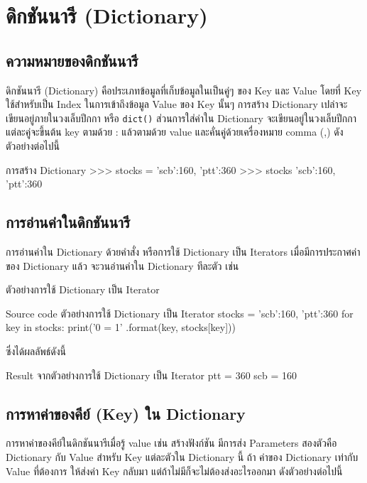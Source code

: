 \chapter{ดิกชันนารี (Dictionary)}
\section{ความหมายของดิกชันนารี}

ดิกชันนารี (Dictionary) คือประเภทข้อมูลที่เก็บข้อมูลในเป็นคู่ๆ ของ Key และ Value โดยที่ Key ใช้สำหรับเป็น Index ในการเข้าถึงข้อมูล Value ของ Key นั้นๆ การสร้าง Dictionary เปล่าจะเขียนอยู่ภายในวงเล็บปีกกา { } หรือ \texttt{dict()} ส่วนการใส่ค่าใน Dictionary จะเขียนอยู่ในวงเล็บปีกกา แต่ละคู่จะขึ้นต้น key ตามด้วย : แล้วตามด้วย value และคั่นคู่ด้วยเครื่องหมาย comma (,) ดังตัวอย่างต่อไปนี้

\begin{codelist}{การสร้าง Dictionary}{}
>>> stocks = {'scb':160, 'ptt':360}
>>> stocks
{'scb':160, 'ptt':360}
\end{codelist}


\section{การอ่านค่าในดิกชันนารี}

การอ่านค่าใน Dictionary ด้วยคำสั่ง  หรือการใช้ Dictionary เป็น Iterators เมื่อมีการประกาศค่าของ Dictionary แล้ว  จะวนอ่านค่าใน Dictionary ทีละตัว เช่น 

\centerline{}

ตัวอย่างการใช้ Dictionary เป็น Iterator

\begin{codelist}{Source code ตัวอย่างการใช้ Dictionary เป็น Iterator}{}
stocks = {'scb':160, 'ptt':360}
for key in stocks:
    print('{0} = {1}' .format(key, stocks[key]))
\end{codelist}

ซึ่งได้ผลลัพธ์ดังนี้

\begin{codelist}{Result จากตัวอย่างการใช้ Dictionary เป็น Iterator}{}
ptt = 360
scb = 160
\end{codelist}


\section{การหาค่าของคีย์ (Key) ใน Dictionary}
การหาค่าของคีย์ในดิกชันนารีเมื่อรู้ value เช่น สร้างฟังก์ชัน  มีการส่ง Parameters สองตัวคือ Dictionary กับ Value สำหรับ Key แต่ละตัวใน Dictionary นี้ ถ้า ค่าของ Dictionary เท่ากับ Value ที่ต้องการ ให้ส่งค่า Key กลับมา แต่ถ้าไม่มีก็จะไม่ต้องส่งอะไรออกมา ดังตัวอย่างต่อไปนี้


